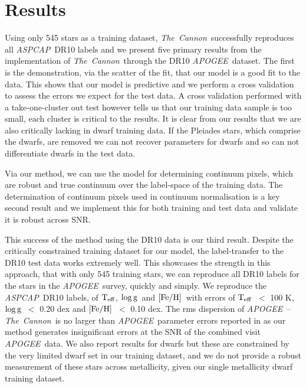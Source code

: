 \documentclass[12pt, preprint]{aastex}
\newcommand{\teff}{\mbox{$\rm T_{eff}$}}
\newcommand{\feh}{\mbox{$\rm [Fe/H]$}}
\newcommand{\logg}{\mbox{$\rm \log g$}}
\newcommand{\tc}{\textsl{The~Cannon}}
\newcommand{\apogee}{\textsl{APOGEE}}
\newcommand{\aspcap}{\textsl{ASPCAP}}
\begin{document}
\section{Results}
\label{sec:results}


Using only 545 stars as a training dataset, \tc\ successfully reproduces all \aspcap\ DR10 labels and we present five primary results from the implementation of \tc\ through the DR10 \apogee\ dataset. The first is the demonstration, via the scatter of the fit, that our model is a good fit to the data. This shows that our model is predictive and we perform a cross validation to assess the errors we expect for the test data. A cross validation performed with a take-one-cluster out test however tells us that our training data sample is too small, each cluster is critical to the results. It is clear from our results that we are also critically lacking in dwarf training data. If the Pleiades stars, which comprise the dwarfs, are removed we can not recover parameters for dwarfs and so can not differentiate dwarfs in the test data.

Via our method, we can use the model for determining continuum pixels, which are robust and true continuum over the label-space of the training data. The determination of continuum pixels used in continuum normalisation is a key second result and we implement this for both training and test data and validate it is robust across SNR. 

This success of the method using the DR10 data is our third result.  Despite the critically constrained training dataset for our model, the label-transfer to the DR10 test data works extremely well. This showcases the strength in this approach, that with only 545 training stars, we can reproduce all DR10 labels for the stars in the \apogee\ survey, quickly and simply.  
We reproduce the \aspcap\ DR10 labels, of \teff, \logg\ and \feh\ with errors of \teff\ $<$ 100 K, \logg\ $<$ 0.20 dex and \feh\ $<$ 0.10 dex. The rms dispersion of \apogee\ -- \tc\ is no larger than \apogee\ parameter errors reported in \citep{Meszaros2013} as our method generates insignificant errors at the SNR of the combined visit \apogee\ data. We also report results for dwarfs but these are constrained by the very limited dwarf set in our training dataset, and we do not provide a robust measurement of these stars across metallicity, given our single metallicity dwarf training dataset.
\end{document}
